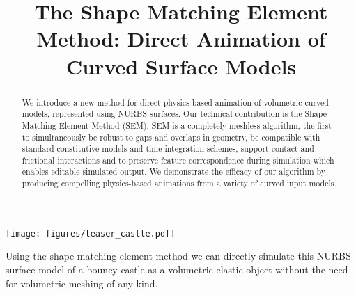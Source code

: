 \documentclass[acmtog, anonymous,review, nonacm, balance = false]{acmart}
\begin{document}
\title{The Shape Matching Element Method: Direct Animation of Curved Surface Models}

\begin{teaserfigure}
  \texttt{[image: figures/teaser\_castle.pdf]}
  \caption{Using the shape matching element method we can directly simulate this NURBS surface model of a bouncy castle as a volumetric elastic object without the need for volumetric meshing of any kind.}
  \label{fig:teaser}
\end{teaserfigure}

\begin{abstract}
We introduce a new method for direct physics-based animation of volumetric curved models, represented using NURBS surfaces.  
Our technical contribution is the Shape Matching Element Method (SEM).
SEM is a completely meshless algorithm, the first to simultaneously 
be robust to gaps and overlaps in geometry, 
be compatible with standard constitutive models and time integration schemes, support contact and frictional interactions  
and to preserve feature correspondence during simulation which enables editable simulated output. 
We demonstrate the efficacy of our algorithm by producing compelling physics-based animations from a variety of curved input models.
\end{abstract}

\maketitle










\end{document}
